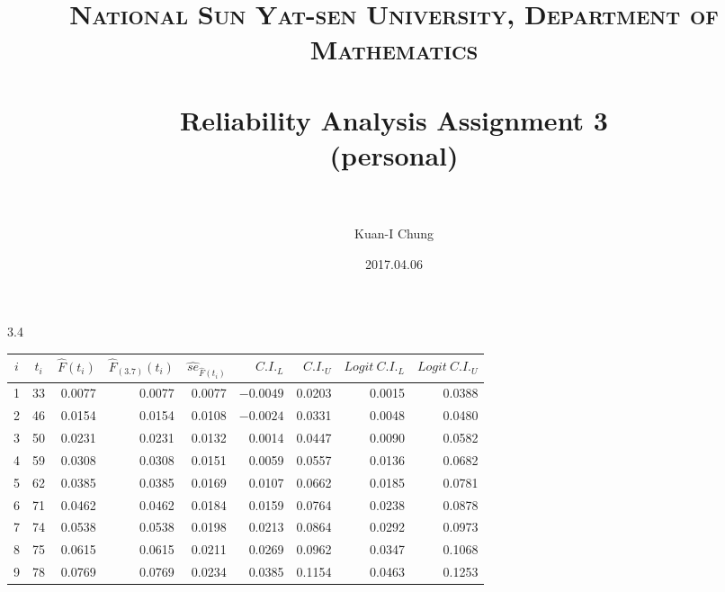 \documentclass[paper=a4, fontsize=12pt]{scrartcl} %
\title{	
\normalfont \normalsize 
\textsc{National Sun Yat-sen University, Department of Mathematics} \\ [25pt] %
\horrule{0.5pt} \\[0.4cm] %
\huge Reliability Analysis Assignment 3 \\(personal)\\ %
\horrule{2pt} \\[0.5cm] %
}
\author{Kuan-I Chung} %
\date{\normalsize 2017.04.06} %
\numberwithin{equation}{section} %
\numberwithin{figure}{section} %
\numberwithin{table}{section} %
\begin{document}
\maketitle %

3.4
		\begin{table}[h]
			\begin{center}
			\begin{tabular}{ccrrrrrrr}
				$i$  	& 	$t_i$ 	&  	$\widehat{F}(t_i)$	&  $\widehat{F}_{(3.7)}(t_i)$ & 
				$\widehat{se}_{\widehat{F}(t_i)}$ & $C.I._L$ & $C.I._U$ & $Logit\ C.I._L$ & $Logit\ C.I._U$  \\ \hline
				1 & 33 &0.0077 &0.0077 &0.0077 &$-0.0049$ &0.0203   &0.0015   &0.0388\\
				2 & 46 &0.0154 &0.0154 &0.0108 &$-0.0024$ &0.0331   &0.0048   &0.0480\\
				3 & 50 &0.0231 &0.0231 &0.0132  &0.0014 &0.0447   &0.0090   &0.0582\\
				4 & 59 &0.0308 &0.0308 &0.0151  &0.0059 &0.0557   &0.0136   &0.0682\\
				5 & 62 &0.0385 &0.0385 &0.0169  &0.0107 &0.0662   &0.0185   &0.0781\\
				6 & 71 &0.0462 &0.0462 &0.0184  &0.0159 &0.0764   &0.0238   &0.0878\\
				7 & 74 &0.0538 &0.0538 &0.0198  &0.0213 &0.0864   &0.0292   &0.0973\\
				8 & 75 &0.0615 &0.0615 &0.0211  &0.0269 &0.0962   &0.0347   &0.1068\\
				9 & 78 &0.0769 &0.0769 &0.0234  &0.0385 &0.1154   &0.0463   &0.1253
			\end{tabular}
			\end{center}
		\end{table}
\end{document}
